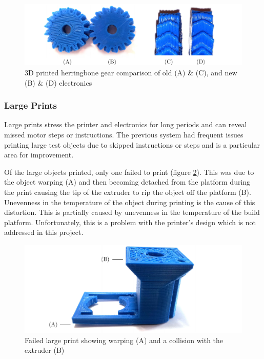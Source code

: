 				\begin{figure}
					\includegraphics[width=1\textwidth]{diagrams/herringbone.pdf}
					\caption[3D printed herringbone gear comparison]{3D printed
					herringbone gear comparison of old (A) \& (C), and new (B) \& (D)
					electronics}
					\label{fig:herringbone}
				\end{figure}
			
			\subsubsection{Large Prints}
				
				Large prints stress the printer and electronics for long periods and can
				reveal missed motor steps or instructions. The previous system had
				frequent issues printing large test objects due to skipped instructions
				or steps and is a particular area for improvement.
				
				Of the large objects printed, only one failed to print (figure
				\ref{fig:failedPrint}). This was due to the object warping (A) and then
				becoming detached from the platform during the print causing the tip of
				the extruder to rip the object off the platform (B). Unevenness in the
				temperature of the object during printing is the cause of this
				distortion. This is partially caused by unevenness in the temperature of
				the build platform. Unfortunately, this is a problem with the printer's
				design which is not addressed in this project.
				
				\begin{figure}
					\includegraphics[width=1\textwidth]{diagrams/failedPrint.pdf}
					\caption{Failed large print showing warping (A) and a collision with
					         the extruder (B)}
					\label{fig:failedPrint}
				\end{figure}
			
